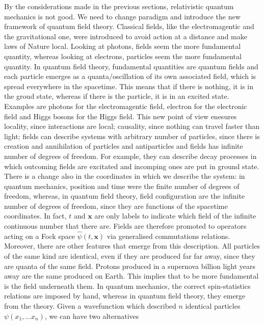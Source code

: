     By the considerations made in the previous sections, relativistic quantum mechanics is not good. We need to change paradigm and introduce the new framework of quantum field theory. Classical fields, like the electromagentic and the gravitational one, were introduced to avoid action at a distance and make laws of Nature local. Looking at photons, fields seem the more fundamental quantity, whereas looking at electrons, particles seem the more fundamental quantity. In quantum field theory, fundamental quantities are quantum fields and each particle emerges as a quanta/oscillation of its own associated field, which is spread everywhere in the spacetime. This means that if there is nothing, it is in the groud state, whereas if there is the particle, it is in an excited state. Examples are photons for the electromagentic field, electron for the electronic field and Higgs bosons for the Higgs field. This new point of view enesures locality, since interactions are local; causality, since nothing can travel faster than light; fields can describe systems with arbitrary number of particles, since there is creation and annihilation of particles and antiparticles and fields has infinite number of degrees of freedom. For example, they can describe decay processes in which outcoming fields are excitated and incomping ones are put in ground state. There is a change also in the coordinates in which we describe the system: in quantum mechanics, position and time were the finite number of degrees of freedom, whereas, in quantum field theory, field configuration are the infinite number of degrees of freedom, since they are functions of the spacetime coordinates. In fact, $t$ and $\mathbf x$ are only labels to indicate which field of the infinite continuous number that there are. Fields are therefore promoted to operators acting on a Fock space $\hat \psi (t, \mathbf x)$ via generalised commutations relations. 
    Moreover, there are other features that emerge from this description. All particles of the same kind are identical, even if they are produced far far away, since they are quanta of the same field. Protons produced in a supernova billion light years away are the same produced on Earth. This implies that to be more fundamental is the field underneath them. In quantum mechanics, the correct spin-statistics relations are imposed by hand, whereas in quantum field theory, they emerge from the theory. Given a wavefunction which described $n$ identical particles $\psi(x_1, \ldots x_n)$, we can have two alternatives 
